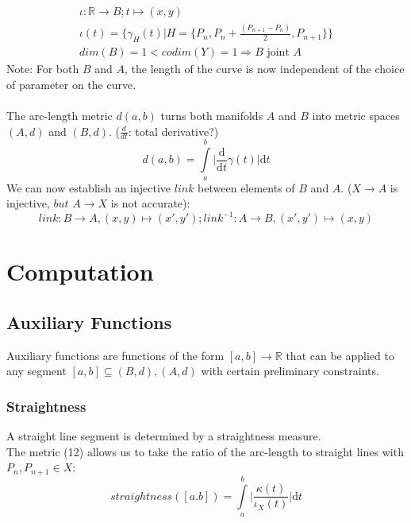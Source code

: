 \documentclass{article}
\begin{document}
\begin{align}
\iota: \mathbb{R} \rightarrow B; t \mapsto (x,y)\\
\iota(t) = \{ \gamma_{H}(t)\lvert H=\{P_{n},P_{n}+\frac{(P_{n+1}-P_{n})}{2},P_{n+1}\}\}\\
dim(B)=1<codim(Y)=1 \Rightarrow B \text{ joint } A
\end{align}
Note: For both $B$ and $A$, the length of the curve is now independent of the choice of parameter on the curve. ~\cite[]{Taimanov}\\\\
The arc-length metric $d(a,b)$ turns both manifolds $A$ and $B$ into metric spaces $(A,d)$ and $(B,d)$. ($\frac{d}{dt}$: total derivative?)
\begin{equation}
d(a,b) = \int \limits _{a}^{b}\lvert \frac{\mathrm{d}}{\mathrm{d}t}\gamma(t)\rvert \mathrm{d}t
\end{equation}
We can now establish an injective $link$ between elements of $B$ and $A$. ($X \rightarrow A$ is injective, $but$ $A \rightarrow X$ is not accurate):
\begin{equation}
link: B \rightarrow A, (x,y) \mapsto (x',y'); link^{-1}: A \rightarrow B, (x',y') \mapsto (x,y)
\end{equation}
\section{Computation}

\subsection{Auxiliary Functions}

Auxiliary functions are functions of the form $[a,b] \rightarrow \mathbb{R}$ that can be applied to any segment $[a,b] \subseteq (B,d),(A,d)$ with certain preliminary constraints.

\subsubsection{Straightness}
A straight line segment is determined by a straightness measure.\\
The metric (12) allows us to take the ratio of the arc-length to straight lines with $P_{n},P_{n+1} \in X$:
\begin{equation}
straightness([a.b])=\int \limits _{a}^{b}\lvert \frac{\kappa(t)}{\iota_{X}(t)}\rvert \mathrm{d}t
\end{equation}
\iffalse
\end{document}
